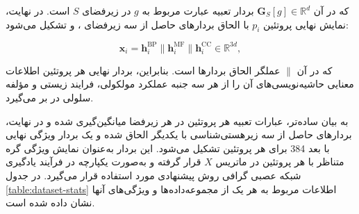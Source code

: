  که در آن $\mathbf{G}_{S}[g]\in\mathbb{R}^{d}$ بردار تعبیه عبارت  مربوط به $g$ در زیر‌فضای $S$ است. در نهایت، نمایش نهایی پروتئین $p_i$ با الحاق بردارهای حاصل از سه زیر‌فضای ، و  تشکیل می‌شود:
 
 \begin{equation}
 	\mathbf{x}_i
 	=
 	\mathbf{h}_{i}^{\mathrm{BP}}
 	\mathbin{\|} 
 	\mathbf{h}_{i}^{\mathrm{MF}}
 	\mathbin{\|} 
 	\mathbf{h}_{i}^{\mathrm{CC}}
 	\in \mathbb{R}^{3d},
 	\label{eq:go-concat}
 \end{equation}
 
 که در آن $\|$ عملگر الحاق بردارها است. بنابراین، بردار نهایی هر پروتئین اطلاعات معنایی حاشیه‌نویسی‌های  آن را از هر سه جنبه عملکرد مولکولی، فرایند زیستی و مؤلفه سلولی در بر می‌گیرد.
 
 به بیان ساده‌تر، عبارات تعبیه  هر پروتئین در هر زیرفضا میانگین‌گیری شده و در نهایت، بردارهای حاصل از سه زیرهستی‌شناسی با یکدیگر الحاق شده و یک بردار ویژگی نهایی با بعد 384 برای هر پروتئین تشکیل می‌شود. این بردار به‌عنوان نمایش ویژگی گره متناظر با هر پروتئین در ماتریس $X$ قرار گرفته و به‌صورت یکپارچه در فرآیند یادگیری شبکه عصبی گرافی روش پیشنهادی مورد استفاده قرار می‌گیرد. در جدول \ref{table:dataset-stats} اطلاعات مربوط به هر یک از مجموعه‌داده‌ها و ویژگی‌های آنها نشان داده شده است. 

 
\begin{table}[h]
	\centering
	\caption{اطلاعات مجموعه‌ داده‌های }
	\label{table:dataset-stats}
	\vspace{3mm}
	
	
	
\end{table} 
 

